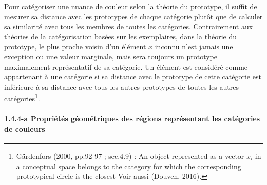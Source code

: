 \documentclass{article}
\begin{document}
Pour catégoriser une nuance de couleur selon la théorie du prototype, il suffit de mesurer sa distance avec les prototypes de chaque catégorie plutôt que de calculer sa similarité avec tous les membres de toutes les catégories. Contrairement aux théories de la catégorisation basées sur les exemplaires, dans la théorie du prototype, le plus proche voisin d’un élément $x$ inconnu n’est jamais une exception ou une valeur marginale, mais sera toujours un prototype maximalement représentatif de sa catégorie. Un élément est considéré comme appartenant à une catégorie si sa distance avec le prototype de cette catégorie est inférieure à sa distance avec tous les autres prototypes de toutes les autres catégories\footnote{Gärdenfors (2000, pp.92-97 ; sec.4.9) : \og An object represented as a vector $x_i$ in a conceptual space belongs to the category for which the corresponding prototypical circle is the closest \fg Voir aussi (Douven, 2016).}. 

\paragraph{1.4.4-a Propriétés géométriques des régions représentant les catégories de couleurs}\mbox{}
\end{document}
